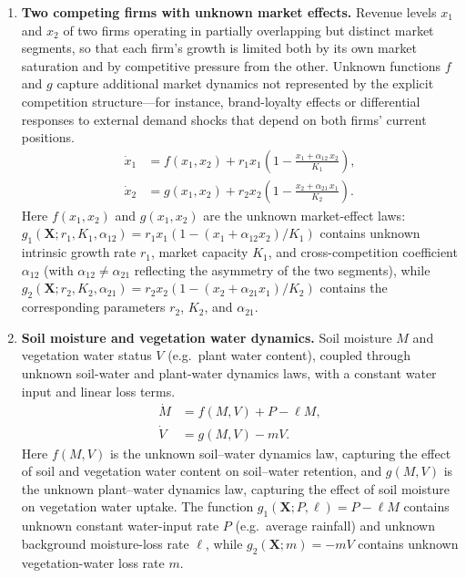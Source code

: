 \documentclass{article}
\theoremstyle{plain}
\theoremstyle{definition}
\renewcommand{\vec}[1]{\boldsymbol{#1}}
\begin{document}
{\begin{enumerate}
    \item \textbf{Two competing firms with unknown market effects.} Revenue levels $x_1$ and $x_2$ of two firms operating in partially overlapping but distinct market segments, so that each firm's growth is limited both by its own market saturation and by competitive pressure from the other. Unknown functions $f$ and $g$ capture additional market dynamics not represented by the explicit competition structure---for instance, brand-loyalty effects or differential responses to external demand shocks that depend on both firms' current positions.
    \begin{align*}
        \dot{x}_1 &= f(x_1,x_2) + r_1 x_1\!\left(1 - \frac{x_1 + \alpha_{12}\,x_2}{K_1}\right), \\
        \dot{x}_2 &= g(x_1,x_2) + r_2 x_2\!\left(1 - \frac{x_2 + \alpha_{21}\,x_1}{K_2}\right).
    \end{align*}
    Here $f(x_1,x_2)$ and $g(x_1,x_2)$ are the unknown market-effect laws: $g_1(\vec{X};r_1,K_1,\alpha_{12}) = r_1 x_1(1-(x_1+\alpha_{12}x_2)/K_1)$ contains unknown intrinsic growth rate $r_1$, market capacity $K_1$, and cross-competition coefficient $\alpha_{12}$ (with $\alpha_{12} \neq \alpha_{21}$ reflecting the asymmetry of the two segments), while $g_2(\vec{X};r_2,K_2,\alpha_{21}) = r_2 x_2(1-(x_2+\alpha_{21}x_1)/K_2)$ contains the corresponding parameters $r_2$, $K_2$, and $\alpha_{21}$.

    \item \textbf{Soil moisture and vegetation water dynamics.} Soil moisture $M$ and vegetation water status $V$ (e.g.\ plant water content), coupled through unknown soil-water and plant-water dynamics laws, with a constant water input and linear loss terms.
    \begin{align*}
        \dot{M} &= f(M,V) + P - \ell M, \\
        \dot{V} &= g(M,V) - mV.
    \end{align*}
    Here $f(M,V)$ is the unknown soil--water dynamics law, capturing the effect of soil and vegetation water content on soil--water retention, and $g(M,V)$ is the unknown plant--water dynamics law, capturing the effect of soil moisture on vegetation water uptake. The function $g_1(\vec{X};P,\ell) = P - \ell M$ contains unknown constant water-input rate $P$ (e.g.\ average rainfall) and unknown background moisture-loss rate $\ell$, while $g_2(\vec{X};m) = -mV$ contains unknown vegetation-water loss rate $m$.
\end{enumerate}

}
\end{document}
